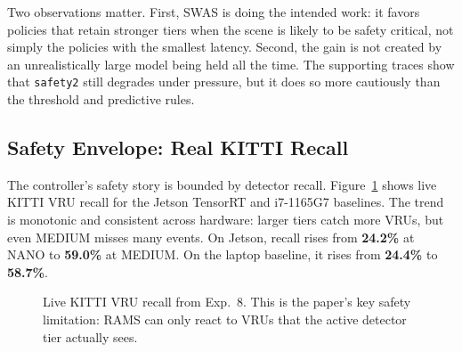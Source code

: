 \documentclass[10pt,journal]{IEEEtran}
\newcommand{\rams}{RAMS}
\newcommand{\swas}{SWAS}
\begin{document}
Two observations matter. First, \swas{} is doing the intended work: it favors policies that retain stronger tiers when the scene is likely to be safety critical, not simply the policies with the smallest latency. Second, the gain is not created by an unrealistically large model being held all the time. The supporting traces show that \texttt{safety2} still degrades under pressure, but it does so more cautiously than the threshold and predictive rules.

\subsection{Safety Envelope: Real KITTI Recall}
The controller's safety story is bounded by detector recall. Figure~\ref{fig:recall} shows live KITTI VRU recall for the Jetson TensorRT and i7-1165G7 baselines. The trend is monotonic and consistent across hardware: larger tiers catch more VRUs, but even MEDIUM misses many events. On Jetson, recall rises from \textbf{24.2\%} at NANO to \textbf{59.0\%} at MEDIUM. On the laptop baseline, it rises from \textbf{24.4\%} to \textbf{58.7\%}.

\begin{figure}[t]
\centering
{}
\caption{Live KITTI VRU recall from Exp.~8. This is the paper's key safety limitation: \rams{} can only react to VRUs that the active detector tier actually sees.}
\label{fig:recall}
\end{figure}
\end{document}
